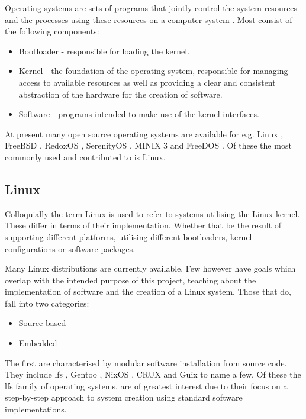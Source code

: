 Operating systems are sets of programs that jointly control the system resources and the processes using these resources on a computer system \cite{oxford-os,cambridge-os}. Most consist of the following components:


\begin{itemize}
    \item Bootloader - responsible for loading the kernel.
    \item Kernel - the foundation of the operating system, responsible for managing access to available resources as well as providing a clear and consistent abstraction of the hardware for the creation of software.
    \item Software - programs intended to make use of the kernel interfaces.
\end{itemize}

At present many open source operating systems are available for e.g. Linux \cite{linux}, FreeBSD \cite{freebsd}, RedoxOS \cite{redox}, SerenityOS \cite{serenity}, MINIX 3 \cite{minix3} and FreeDOS \cite{freedos}. Of these the most commonly used and contributed to is Linux.

\subsection{Linux}

Colloquially the term Linux is used to refer to systems utilising the Linux kernel. These differ in terms of their implementation. Whether that be the result of supporting different platforms, utilising different bootloaders, kernel configurations or software packages.

Many Linux distributions are currently available. Few however have goals which overlap with the intended purpose of this project, teaching about the implementation of software and the creation of a Linux system. Those that do, fall into two categories:

\begin{itemize}
    \item Source based
    \item Embedded
\end{itemize}

The first are characterised by modular software installation from source code. They include \gls{lfs} \cite{lfs}, Gentoo \cite{gentoo}, NixOS \cite{nixos}, CRUX \cite{crux} and  Guix \cite{guix} to name a few. Of these the \gls{lfs} family of operating systems, are of greatest interest due to their focus on a step-by-step approach to system creation using standard software implementations.

